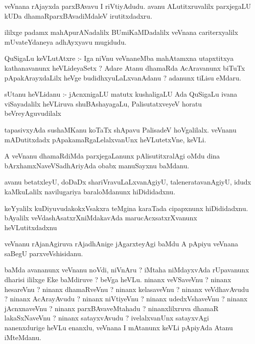 \documentclass{article}
\begin{document}
\begin{mn}
veVnana rAjayxda parxBAvavu I riVtiyAdudu.  avanu ALutitxruvalilx  parxjegaLU 
kUDa dhamaRparxBAvadiMdaleV  irutitxdadxru.
\end{mn}

\begin{mn}
ililxge padamx mahApurANadalilx BUmiKaMDadalilx veVnana cariterxyalilx mUvateYdaneya adhAyxyavu mugidudu.
\end{mn}




\begin{mn}
QuSigaLu keVLutAtxre :- Iga niVnu veVnaneMba mahAtamxna utapxtitxya kathanavanunx 
heVLideyaSetx ?  Adare Atanu dhamaRda AcAravanunx biTuTx pApakArayxdaLilx 
heVge budidhxyuLaLxvanAdanu ?  adanunx tiLisu eMdaru. 
\end{mn}

\begin{mn}
sUtanu heVLidanu :- jAcnxnigaLU matutx  kushaligaLU  Ada QuSigaLu ivana 
viSayadalilx  heVLiruva  shuBAshayagaLu, PalisutatxveyeV horatu beVreyAguvudilalx
\end{mn}

\begin{mn}
tapasivxyAda sushaMKanu  koTaTx shApavu PalisadeV hoVgalilalx.  veVnanu 
mADutitxdadx pApakamaRgaLelalxvanUnx  heVLutetxVne, keVLi.
\end{mn}

\begin{mn}
A veVnanu dhamaRdiMda parxjegaLanunx pAlisutitxralAgi oMdu dina bArxhamxNaveVSadhAriyAda obabx manuSayxnu baMdanu.
\end{mn}

\begin{mn}
avanu betatxleyU, doDaDx shariVravuLaLxvanAgiyU, taleneratavanAgiyU, idudx 
kaMkuLalilx navilugariya baraloMdanunx hiDididadxnu.
\end{mn}

\begin{mn}
keYyalilx kuDiyuvudakokxVsakxra teMgina karaTada cipapxnunx hiDididadxnu.  
bAyalilx veVdashAsatxrXniMdakavAda  marucAcxsatxrXvanunx heVLutitxdadxnu
\end{mn}

\begin{mn}
veVnanu rAjanAgiruva rAjadhAnige jAgarxteyAgi baMdu A pApiyu veVnana saBegU parxveVshisidanu.
\end{mn}

\begin{mn}
baMda avananunx veVnanu noVdi, niVnAru ?  iMtaha niMdayxvAda rUpavanunx dharisi 
ililxge Eke baMdiruve ?  beVga  heVLu.  ninanx veVSaveVnu ?  ninanx hesareVnu ?  
ninanx dhamaRveVnu ?  ninanx kelasaveVnu ? ninanx veVdhavAvudu ?  ninanx AcArayAvudu ?  
ninanx niVtiyeVnu ?  ninanx udedxVshaveVnu ?  ninanx jAcnxnaveVnu ?  ninanx parxBAvaveMtahadu ?  
ninanxlilxruva dhamaR lakaSxNaveVnu ?  ninanx satayxvAvudu ?  ivelalxvanUnx  satayxvAgi 
nanenxdurige heVLu enanxlu, veVnana I mAtanunx keVLi pApiyAda Atanu iMteMdanu.
\end{mn}
\end{document}
